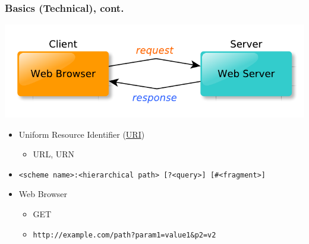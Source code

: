 \documentclass{beamer}
\begin{document}
\begin{frame}\frametitle{Basics (Technical), cont.} 

  \begin{center}
    \includegraphics[scale=0.55]{diagrams/web_client_server.pdf}  
  \end{center}

  \pause
  
  \begin{itemize}
  
    \item Uniform Resource Identifier (\href{http://en.wikipedia.org/wiki/URI}{URI})
    \begin{itemize}
      \item URL, URN
    \end{itemize}
    
    \item \small \texttt{<scheme name>:<hierarchical path> [?<query>] [\#<fragment>] }

    \pause 
    
    \item Web Browser
    \begin{itemize}
      \item GET
      \item \texttt{http://example.com/path?param1=value1\&p2=v2}
    \end{itemize}
    

  \end{itemize}
\end{frame}
\end{document}
